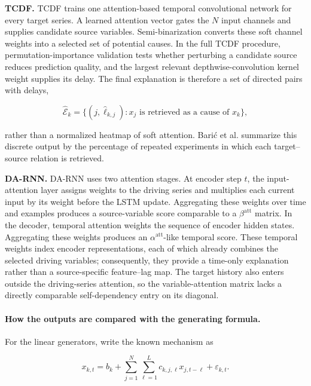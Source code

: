 \textbf{TCDF.}
TCDF \citep{nauta2019tcdf} trains one attention-based temporal convolutional
network for every target series. A learned attention vector gates the $N$ input
channels and supplies candidate source variables. Semi-binarization converts
these soft channel weights into a selected set of potential causes. In the full
TCDF procedure, permutation-importance validation tests whether perturbing a
candidate source reduces prediction quality, and the largest relevant
depthwise-convolution kernel weight supplies its delay. The final explanation
is therefore a set of directed pairs with delays,

\begin{equation}
    \widehat{\mathcal{E}}_k
    = \{(j,\widehat{\ell}_{k,j}) :
    x_j\text{ is retrieved as a cause of }x_k\},
\end{equation}

rather than a normalized heatmap of soft attention. Bari\'c et al. summarize
this discrete output by the percentage of repeated experiments in which each
target--source relation is retrieved.

\textbf{DA-RNN.}
DA-RNN \citep{qin2017darnn} uses two attention stages. At encoder step $t$, the
input-attention layer assigns weights to the driving series and multiplies each
current input by its weight before the LSTM update. Aggregating these weights
over time and examples produces a source-variable score comparable to a
$\beta^{\mathrm{att}}$ matrix. In the decoder, temporal attention weights the
sequence of encoder hidden states. Aggregating these weights produces an
$\alpha^{\mathrm{att}}$-like
temporal score. These temporal weights index encoder representations, each of
which already combines the selected driving variables; consequently, they
provide a time-only explanation rather than a source-specific feature--lag
map. The target history also enters outside the driving-series attention, so
the variable-attention matrix lacks a directly comparable self-dependency entry
on its diagonal.

\paragraph{How the outputs are compared with the generating formula.}
For the linear generators, write the known mechanism as

\begin{equation}
    x_{k,t}
    = b_k + \sum_{j=1}^{N}\sum_{\ell=1}^{L}
      c_{k,j,\ell}x_{j,t-\ell} + \varepsilon_{k,t}.
\end{equation}

